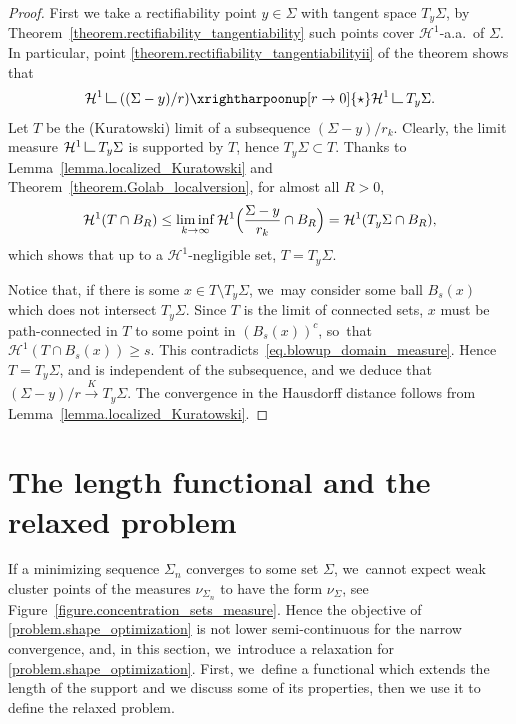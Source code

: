 \documentclass[JEP,XML,SOM,Unicode,NoFloatCountersInSection,published]{cedram}
\theoremstyle{definition}
\newcommand\LM[1]{\hbox{\vrule width.5pt \vbox to#1pt{\vfill \hrule width#1pt height.5pt}}}
\newcommand\LL{{\mathchoice {\>\LM7\>}{\>\LM7\>}{\,\LM5\,}{\,\LM{3.35}\,}}}
\newcommand{\mres}{\LL}
\newcommand\cH{\mathcal{H}}
\begin{document}
\begin{proof}
First we take a rectifiability point $y \in \Sigma$ with tangent space $T_y\Sigma$,
by Theorem~\ref{theorem.rectifiability_tangentiability} such points cover $\cH^1$-a.a.~of $\Sigma$.
In particular, point \eqref{theorem.rectifiability_tangentiabilityii} of the theorem shows that
\[
\cH^1\mres((\Sigma-y)/r)\xrightharpoonup[r \to 0]{\star} \cH^1\mres T_y\Sigma.
\]
Let $T$ be the (Kuratowski) limit of a subsequence $(\Sigma-y)/r_k$.
Clearly, the limit measure $\cH^1\mres T_y\Sigma$ is supported by $T$, hence $T_y\Sigma\subset T$.
Thanks
to Lemma~\ref{lemma.localized_Kuratowski} and Theorem~\ref{theorem.Golab_localversion}, for
almost all $R>0$,
\begin{equation}
\cH^1(T\cap B_R) \le \liminf_{k\to\infty} \cH^1\Bigl(\frac{\Sigma-y}{r_k}\cap B_R\Bigr)
= \cH^1(T_y\Sigma\cap B_R),\label{eq.blowup_domain_measure}
\end{equation}
which shows that up to a $\cH^1$-negligible set, $T=T_y\Sigma$.

Notice that, if there is some $x \in T\setminus T_y\Sigma$, we~may consider some ball $B_s(x)$ which does not intersect $T_y\Sigma$. Since $T$ is the limit of connected sets, $x$ must be path-connected in $T$ to some point in $(B_s(x))^c$, so~that $\cH^1(T\cap B_s(x))\ge s$. This contradicts~\eqref{eq.blowup_domain_measure}. Hence $T=T_y\Sigma$, and is independent of the subsequence, and we deduce that $(\Sigma-y)/r\stackrel{K}{\to} T_y\Sigma$. The convergence in the Hausdorff distance follows from Lemma~\ref{lemma.localized_Kuratowski}.
\end{proof}

\section{The length functional and the relaxed problem}\label{section.the_problem}
If a minimizing sequence $\Sigma_n$ converges to some set $\Sigma$, we~cannot expect weak cluster points of the measures $\nu_{\Sigma_n}$ to have the form $\nu_\Sigma$, see Figure~\ref{figure.concentration_sets_measure}. Hence the objective of \eqref{problem.shape_optimization} is not lower semi-continuous for the narrow convergence, and, in this section, we~introduce a relaxation for \eqref{problem.shape_optimization}. First, we~define a functional which extends the length of the support and we discuss some of its properties, then we use it to define the relaxed problem.
\end{document}
